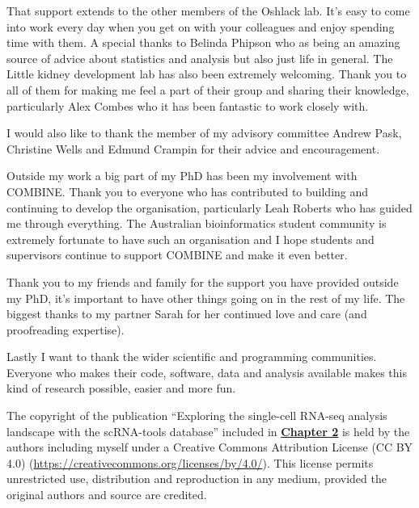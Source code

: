 \documentclass[11pt,a4paper,titlepage,twoside,openright]{style/unimelbthesis}
\theoremstyle{definition}
\theoremstyle{definition}
\theoremstyle{definition}
\theoremstyle{remark}
\begin{document}
\begin{frontmatter}
\begin{acknowledgements}
    That support extends to the other members of the Oshlack lab. It's easy to come into work every day when you get on with your colleagues and enjoy spending time with them. A special thanks to Belinda Phipson who as being an amazing source of advice about statistics and analysis but also just life in general. The Little kidney development lab has also been extremely welcoming. Thank you to all of them for making me feel a part of their group and sharing their knowledge, particularly Alex Combes who it has been fantastic to work closely with.
    
    I would also like to thank the member of my advisory committee Andrew Pask, Christine Wells and Edmund Crampin for their advice and encouragement.
    
    Outside my work a big part of my PhD has been my involvement with COMBINE. Thank you to everyone who has contributed to building and continuing to develop the organisation, particularly Leah Roberts who has guided me through everything. The Australian bioinformatics student community is extremely fortunate to have such an organisation and I hope students and supervisors continue to support COMBINE and make it even better.
    
    Thank you to my friends and family for the support you have provided outside my PhD, it's important to have other things going on in the rest of my life. The biggest thanks to my partner Sarah for her continued love and care (and proofreading expertise).
    
    Lastly I want to thank the wider scientific and programming communities. Everyone who makes their code, software, data and analysis available makes this kind of research possible, easier and more fun.
  \end{acknowledgements}


  \hypersetup{linkcolor=black}
  \setcounter{tocdepth}{2}
  \tableofcontents




  \listoffigures


  \begin{copyrightlist}
    The copyright of the publication ``Exploring the single-cell RNA-seq analysis landscape with the scRNA-tools database'' included in \textbf{\protect\hyperlink{tools}{Chapter 2}} is held by the authors including myself under a Creative Commons Attribution License (CC BY 4.0) (\url{https://creativecommons.org/licenses/by/4.0/}). This license permits unrestricted use, distribution and reproduction in any medium, provided the original authors and source are credited.
    

\end{copyrightlist}
\end{frontmatter}
\end{document}
